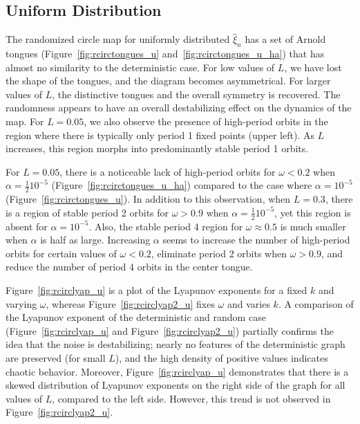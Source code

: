 \subsection{Uniform Distribution}
The randomized circle map for uniformly distributed $\hat{\xi}_n$ has
a set of Arnold tongues (Figure~\ref{fig:rcirctongues_u} and~\ref{fig:rcirctongues_u_ha}) that has almost no similarity to the deterministic
case. For low values of $L$, we have lost the
shape of the tongues, and the diagram becomes asymmetrical. For larger
values of $L$, the distinctive tongues and the overall symmetry is
recovered. The randomness appears to have an overall destabilizing
effect on the dynamics of the map. For $L=0.05$, we also observe the
presence of high-period orbits in the region where there is typically
only period 1 fixed points (upper left). As $L$ increases, this region
morphs into predominantly stable period 1 orbits. 

For $L=0.05$, there is a noticeable lack of high-period orbits for
$\omega<0.2$ when $\alpha = \frac{1}{2}10^{-5}$
(Figure~\ref{fig:rcirctongues_u_ha}) compared to the case where
$\alpha = 10^{-5}$ (Figure~\ref{fig:rcirctongues_u}). In addition to
this observation, when $L=0.3$, there is a region of stable period 2
orbits for $\omega > 0.9$ when $\alpha = \frac{1}{2}10^{-5}$, yet this
region is absent for $\alpha = 10^{-5}$. Also, the stable period 4
region for $\omega \approx 0.5$ is much smaller when $\alpha$ is half
as large. Increasing $\alpha$ seems to increase the number of
high-period orbits for certain values of $\omega < 0.2$, eliminate period
2 orbits when $\omega >0.9$, and reduce the number of period 4 orbits
in the center tongue. 

Figure~\ref{fig:rcirclyap_u} is a plot of the Lyapunov
exponents for a fixed $k$ and varying $\omega$, whereas
Figure~\ref{fig:rcirclyap2_u} fixes $\omega$ and varies $k$. A comparison of the Lyapunov exponent of the deterministic and random
case (Figure~\ref{fig:rcirclyap_u} and Figure~\ref{fig:rcirclyap2_u})
partially confirms the idea that the noise is destabilizing; nearly no
features of the deterministic graph are preserved (for small $L$), and the high
density of positive values indicates chaotic
behavior. Moreover, Figure~\ref{fig:rcirclyap_u} demonstrates that there is a skewed
distribution of Lyapunov exponents on the right side of the graph for
all values of $L$, compared to the left side. However, this trend is
not observed in Figure~\ref{fig:rcirclyap2_u}.


